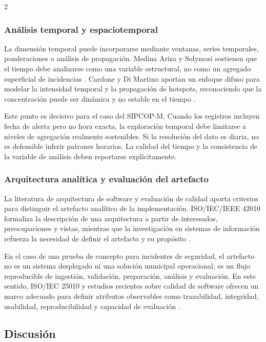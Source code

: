 \documentclass[10pt,twoside]{article}
\begin{document}
\begin{multicols}{2}
\subsubsection{Análisis temporal y espaciotemporal}

La dimensión temporal puede incorporarse mediante ventanas, series temporales, ponderaciones o análisis de propagación. Medina Ariza y Solymosi sostienen que el tiempo debe analizarse como una variable estructural, no como un agregado superficial de incidencias \cite{medinaariza2023time}. Cardone y Di Martino aportan un enfoque difuso para modelar la intensidad temporal y la propagación de hotspots, reconociendo que la concentración puede ser dinámica y no estable en el tiempo \cite{cardone2022fuzzyhotspot}.

Este punto es decisivo para el caso del SIPCOP-M. Cuando los registros incluyen fecha de alerta pero no hora exacta, la exploración temporal debe limitarse a niveles de agregación realmente sostenibles. Si la resolución del dato es diaria, no es defensible inferir patrones horarios. La calidad del tiempo y la consistencia de la variable de análisis deben reportarse explícitamente.

\subsubsection{Arquitectura analítica y evaluación del artefacto}

La literatura de arquitectura de software y evaluación de calidad aporta criterios para distinguir el artefacto analítico de la implementación. ISO/IEC/IEEE 42010 formaliza la descripción de una arquitectura a partir de interesados, preocupaciones y vistas, mientras que la investigación en sistemas de información refuerza la necesidad de definir el artefacto y su propósito \cite{iso42010_2022,weigand2023artifact}.

En el caso de una prueba de concepto para incidentes de seguridad, el artefacto no es un sistema desplegado ni una solución municipal operacional; es un flujo reproducible de ingestión, validación, preparación, análisis y evaluación. En este sentido, ISO/IEC 25010 y estudios recientes sobre calidad de software ofrecen un marco adecuado para definir atributos observables como trazabilidad, integridad, usabilidad, reproducibilidad y capacidad de evaluación \cite{iso25010_2023,argotti2024quality,schaeffer2025evaluation}.

\subsection{Discusión}


\end{multicols}
\end{document}
